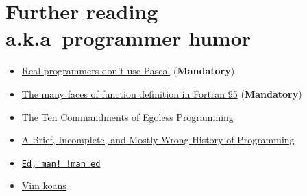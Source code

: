 \documentclass[openany,oneside]{book}
\newcommand{\Chapter}[2]{\chapter[#1]{#1\\[1ex]\Large#2}}
\begin{document}

\mainmatter






\appendix





\backmatter
\Chapter{Further reading}{a.k.a\ programmer humor}
\begin{itemize}
  \item \href{http://www.pbm.com/~lindahl/real.programmers.html}{Real programmers don't use Pascal} (\textbf{Mandatory})
  \item \href{https://gist.github.com/alanbriolat/3135713#file-fortran_hell-f95}{The many faces of function definition in Fortran 95} (\textbf{Mandatory})
  \item \href{http://www.codinghorror.com/blog/2006/05/the-ten-commandments-of-egoless-programming.html}{The Ten Commandments of Egoless Programming}
  \item \href{http://james-iry.blogspot.com/2009/05/brief-incomplete-and-mostly-wrong.html}{A Brief, Incomplete, and Mostly Wrong History of Programming}
  \item \href{https://www.gnu.org/fun/jokes/ed-msg.html}{\texttt{Ed, man! !man ed}}
  \item \href{http://blog.sanctum.geek.nz/vim-koans/}{Vim koans}
\end{itemize}
\end{document}
